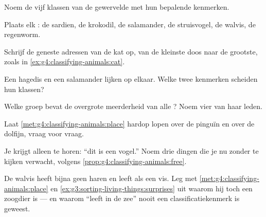 \begin{exercise}[$\star$]\label{exo:g4:classifying-animals:2}
Noem de vijf klassen van de gewervelde  met hun bepalende kenmerken.
\end{exercise}

\begin{exercise}[$\star$]\label{exo:g4:classifying-animals:3}
Plaats elk : de sardien, de krokodil, de salamander, de
struisvogel, de walvis, de regenworm.
\end{exercise}

\begin{exercise}[$\star$]\label{exo:g4:classifying-animals:4}
Schrijf de geneste adressen van de kat op, van de kleinste doos naar de
grootste, zoals in \cref{ex:g4:classifying-animals:cat}.
\end{exercise}

\begin{exercise}[$\star$]\label{exo:g4:classifying-animals:5}
Een hagedis en een salamander lijken op elkaar. Welke twee kenmerken
scheiden hun klassen?
\end{exercise}

\begin{exercise}[$\star$]\label{exo:g4:classifying-animals:6}
Welke groep bevat de overgrote meerderheid van alle ? Noem vier
van haar leden.
\end{exercise}

\begin{exercise}[$\star$]\label{exo:g4:classifying-animals:7}
Laat \cref{met:g4:classifying-animals:place} hardop lopen over de
pinguïn en over de dolfijn, vraag voor vraag.
\end{exercise}

\begin{exercise}[$\star$]\label{exo:g4:classifying-animals:8}
Je krijgt alleen te horen: ``dit  is een vogel.'' Noem drie dingen
die je nu zonder te kijken verwacht, volgens
\cref{prop:g4:classifying-animals:free}.
\end{exercise}

\begin{exercise}[$\star\star$]\label{exo:g4:classifying-animals:9}
De walvis heeft bijna geen haren en leeft als een vis. Leg met
\cref{met:g4:classifying-animals:place} en
\cref{ex:g3:sorting-living-things:surprises} uit waarom hij toch een
zoogdier is --- en waarom ``leeft in de zee'' nooit een
classificatiekenmerk is geweest.
\end{exercise}


